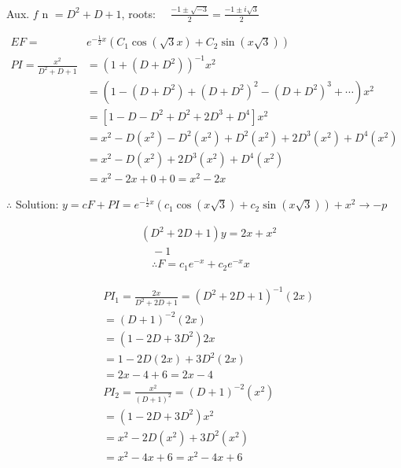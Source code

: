 \documentclass[12pt, a4paper]{article}
\begin{document}
	Aux. $f$ n $=D^{2}+D+1$, roots: $\quad \frac{-1 \pm \sqrt{-3}}{2}=\frac{-1 \pm i \sqrt{3}}{2}$

$$
\begin{aligned}
	E F=                       & e^{-\frac{1}{2} x}\left(C_{1} \cos(\sqrt{3} x)+C_{2} \sin(x \sqrt{3})\right)                                           \\
	P I=\frac{x^2 }{D^{2}+D+1} & =\left(1+\left(D+D^{2}\right)\right)^{-1} x^2                                                                          \\
	                           & =\left(1-\left(D+D^{2}\right)+\left(D+D^{2}\right)^{2}-\left(D+D^{2}\right)^{3}+\cdots\right) x^2                      \\
	                           & =\left[1-D-D^{2}+D^{2}+2 D^{3}+D^{4}\right] x^2                                                                        \\
	                           & =x^2 -D\left(x^2 \right)-D^{2}\left(x^2 \right)+D^{2}\left(x^2 \right)+2 D^{3}\left(x^2 \right)+D^{4}\left(x^2 \right) \\
	                           & =x^2 -D\left(x^2 \right)+2 D^{3}\left(x^2 \right)+D^{4}\left(x^2 \right)                                               \\
	                           & =x^2 -2 x+0+0=x^2 -2 x
\end{aligned}
$$

	$\therefore$ Solution: $y=c F+P I=e^{-\frac{1}{2} x}\left(c_{1} \cos(x \sqrt{3})+c_{2} \sin(x \sqrt{3})\right)+x^2 \rightarrow-p$

$$
\begin{aligned}
	 & \left(D^{2}+2 D+1\right) y=2 x+x^2             \\
	 & \quad-1                                        \\
	 & \quad \therefore F=c_{1} e^{-x}+c_{2} e^{-x} x
\end{aligned}
$$

$$
\begin{aligned}
	 & P I_{1}=\frac{2 x}{D^{2}+2 D+1}=\left(D^{2}+2 D+1\right)^{-1}(2 x) \\
	 & =(D+1)^{-2}(2 x)                                                   \\
	 & =\left(1-2 D+3 D^{2}\right) 2 x                                    \\
	 & =1-2 D(2 x)+3 D^{2}(2 x)                                           \\
	 & =2 x-4+6=2 x-4                                                     \\
	 & P I_{2}=\frac{x^2 }{(D+1)^{2}}=(D+1)^{-2}\left(x^2 \right)         \\
	 & =\left(1-2 D+3 D^{2}\right) x^2                                    \\
	 & =x^2 -2 D\left(x^2 \right)+3 D^{2}\left(x^2 \right)                \\
	 & =x^2 -4 x+6=x^2 -4 x+6
\end{aligned}
$$
\end{document}
